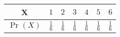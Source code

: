 \providecommand{\pr}[1]{\ensuremath{\Pr\left(#1\right)}}
\normalsize \begin{tabular}{|c|c|c|c|c|c|c|}

\hline
\textbf{X} & $1$ & $2$ & $3$ & $4$ & $5$ & $6$ \\
\hline
\textbf{\pr{X}} & $\frac{1}{6}$ & $\frac{1}{6}$ & $\frac{1}{6}$ & $\frac{1}{6}$ & $\frac{1}{6}$ & $\frac{1}{6}$  \\
\hline
\end{tabular}
